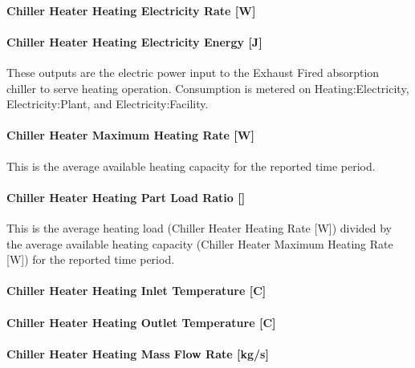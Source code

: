 \paragraph{Chiller Heater Heating Electricity Rate {[}W{]}}\label{chiller-heater-heating-electric-power-w-1}

\paragraph{Chiller Heater Heating Electricity Energy {[}J{]}}\label{chiller-heater-heating-electric-energy-j}

These outputs are the electric power input to the Exhaust Fired absorption chiller to serve heating operation. Consumption is metered on Heating:Electricity, Electricity:Plant, and Electricity:Facility.

\paragraph{Chiller Heater Maximum Heating Rate {[}W{]}}\label{chiller-heater-maximum-heating-rate-w}

This is the average available heating capacity for the reported time period.

\paragraph{Chiller Heater Heating Part Load Ratio {[]}}\label{chiller-heater-heating-part-load-ratio-1}

This is the average heating load (Chiller Heater Heating Rate {[}W{]}) divided by the average available heating capacity (Chiller Heater Maximum Heating Rate {[}W{]}) for the reported time period.

\paragraph{Chiller Heater Heating Inlet Temperature {[}C{]}}\label{chiller-heater-heating-inlet-temperature-c-1}

\paragraph{Chiller Heater Heating Outlet Temperature {[}C{]}}\label{chiller-heater-heating-outlet-temperature-c-1}

\paragraph{Chiller Heater Heating Mass Flow Rate {[}kg/s{]}}\label{chiller-heater-heating-mass-flow-rate-kgs-1}

